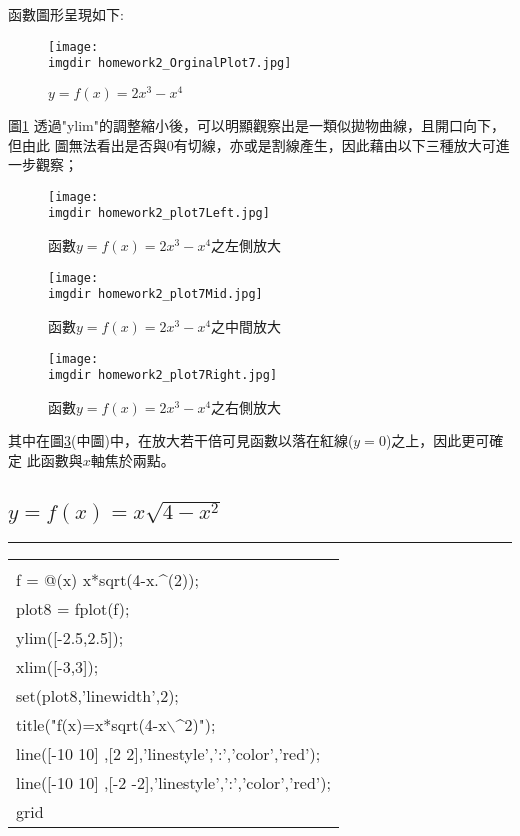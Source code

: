 		函數圖形呈現如下:
		\begin{figure}[H]	
		 	 \centering	 			 	 
   			 \texttt{[image: \\imgdir homework2\_OrginalPlot7.jpg]} 
   			 \caption{$y=f(x)=2x^3-x^4$}   		
   			 \label{plot7}   			 		 
		\end{figure}
		
		圖\ref{plot7} 透過"ylim"的調整縮小後，可以明顯觀察出是一類似拋物曲線，且開口向下，但由此			圖無法看出是否與0有切線，亦或是割線產生，因此藉由以下三種放大可進一步觀察；
		\begin{figure}[H]	
		 	 \centering	 			 	 
   			 \texttt{[image: \\imgdir homework2\_plot7Left.jpg]} 
   			 \caption{函數$y=f(x)=2x^3-x^4$之左側放大}   		
   			 \label{plot7Left}   			 		 
		\end{figure}
		\begin{figure}[H]	
		 	 \centering	 			 	 
   			 \texttt{[image: \\imgdir homework2\_plot7Mid.jpg]} 
   			 \caption{函數$y=f(x)=2x^3-x^4$之中間放大}   		
   			 \label{plot7Mid}   			 		 
		\end{figure}
		\begin{figure}[H]	
		 	 \centering	 			 	 
   			 \texttt{[image: \\imgdir homework2\_plot7Right.jpg]} 
   			 \caption{函數$y=f(x)=2x^3-x^4$之右側放大}   		
   			 \label{plot7Right}   			 		 
		\end{figure}
		其中在圖\ref{plot7Mid}(中圖)中，在放大若干倍可見函數以落在紅線($y=0$)之上，因此更可確定			此函數與$x$軸焦於兩點。
		\newpage
		\subsection{$y=f(x)=x\sqrt{4-x^2}$}%
		\rule{\textwidth}{0.2pt}
		\begin{center}\colorbox{slight}{
				\begin{tabular}{p{}}
					\MJHmarker{\textbf{MATLAB語法 :}}\\					
					f = @(x) x*sqrt(4-x.$\^$(2));\\
					plot8 = fplot(f);\\
					ylim([-2.5,2.5]);\\
					xlim([-3,3]);\\
					set(plot8,'linewidth',2);\\
					title("f(x)=x*sqrt(4-x$\backslash\^$2)");\\
					line([-10 10] ,[2 2],'linestyle',':','color','red');\\
					line([-10 10] ,[-2 -2],'linestyle',':','color','red');\\
					grid\\
				\end{tabular}
			}
			\end{center}			
		
